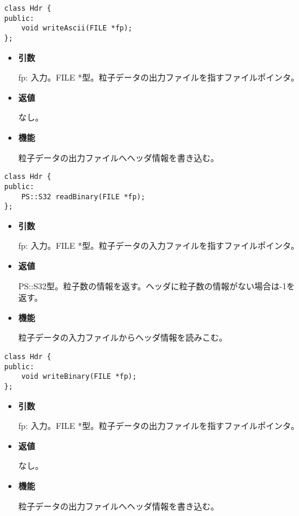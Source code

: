 \label{sec:Hdr_writeAscii}  


\begin{screen}
\begin{verbatim}
class Hdr {
public:
    void writeAscii(FILE *fp);
};
\end{verbatim}
\end{screen}

\begin{itemize}

\item {\bf 引数}

  fp: 入力。FILE *型。粒子データの出力ファイルを指すファイルポインタ。
  
\item {\bf 返値}

  なし。
  
\item {\bf 機能}

  粒子データの出力ファイルへヘッダ情報を書き込む。
  
\end{itemize}
  
\label{sec:Hdr_readBinary}

\begin{screen}
\begin{verbatim}
class Hdr {
public:
    PS::S32 readBinary(FILE *fp);
};
\end{verbatim}
\end{screen}

\begin{itemize}

\item {\bf 引数}

  fp: 入力。FILE *型。粒子データの入力ファイルを指すファイルポインタ。
  
\item {\bf 返値}

  PS::S32型。粒子数の情報を返す。ヘッダに粒子数の情報がない場合は-1を
  返す。
  
\item {\bf 機能}

  粒子データの入力ファイルからヘッダ情報を読みこむ。
  
\end{itemize}


\label{sec:Hdr_writeBinary}

\begin{screen}
\begin{verbatim}
class Hdr {
public:
    void writeBinary(FILE *fp);
};
\end{verbatim}
\end{screen}

\begin{itemize}

\item {\bf 引数}

  fp: 入力。FILE *型。粒子データの出力ファイルを指すファイルポインタ。
  
\item {\bf 返値}

  なし。
  
\item {\bf 機能}

  粒子データの出力ファイルへヘッダ情報を書き込む。
  
\end{itemize}
